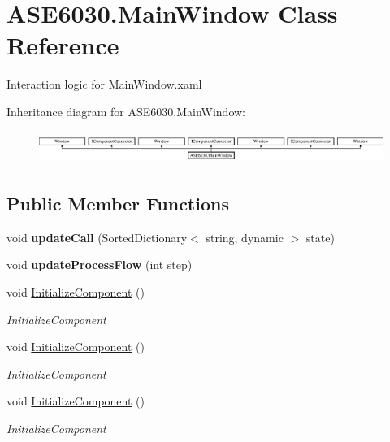 \hypertarget{class_a_s_e6030_1_1_main_window}{}\section{A\+S\+E6030.\+Main\+Window Class Reference}
\label{class_a_s_e6030_1_1_main_window}


Interaction logic for Main\+Window.\+xaml  


Inheritance diagram for A\+S\+E6030.\+Main\+Window\+:\begin{figure}[H]
\begin{center}
\leavevmode
\includegraphics[height=1.073825cm]{class_a_s_e6030_1_1_main_window}
\end{center}
\end{figure}
\subsection*{Public Member Functions}
\begin{DoxyCompactItemize}
\item 
\mbox{\label{class_a_s_e6030_1_1_main_window_adeaea371e5e8ae0d36da0488e3f573a9}} 
void {\bfseries update\+Call} (Sorted\+Dictionary$<$ string, dynamic $>$ state)
\item 
\mbox{\label{class_a_s_e6030_1_1_main_window_a79b6db853cf517f0df08f041b207e7e6}} 
void {\bfseries update\+Process\+Flow} (int step)
\item 
void \hyperlink{class_a_s_e6030_1_1_main_window_ae87e50858240332fce20264ac23638e8}{Initialize\+Component} ()
\begin{DoxyCompactList}\small\item\em Initialize\+Component \end{DoxyCompactList}\item 
void \hyperlink{class_a_s_e6030_1_1_main_window_ae87e50858240332fce20264ac23638e8}{Initialize\+Component} ()
\begin{DoxyCompactList}\small\item\em Initialize\+Component \end{DoxyCompactList}\item 
void \hyperlink{class_a_s_e6030_1_1_main_window_ae87e50858240332fce20264ac23638e8}{Initialize\+Component} ()
\begin{DoxyCompactList}\small\item\em Initialize\+Component \end{DoxyCompactList}\end{DoxyCompactItemize}


